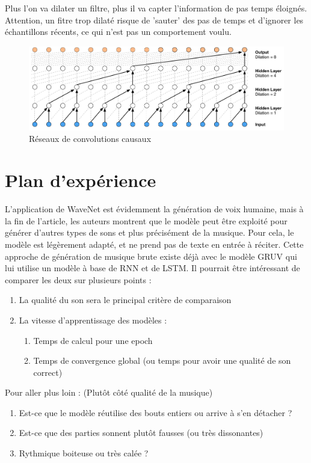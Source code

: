 \documentclass[a4paper]{article}
\begin{document}
Plus l'on va dilater un filtre, plus il va capter l'information de pas temps éloignés. Attention, un fitre trop dilaté risque de 'sauter' des pas de temps et d'ignorer les échantillons récents, ce qui n'est pas un comportement voulu.

\begin{figure}[h]
  \includegraphics[scale=0.2]{modelDilate.png}
  \caption{\label{fig:modelDilate} Réseaux de convolutions causaux}
\end{figure}

\section{Plan d'expérience}

L'application de WaveNet est évidemment la génération de voix humaine, mais à la fin de l'article, les auteurs montrent que le modèle peut être exploité pour générer d'autres types de sons et plus précisément de la musique. Pour cela, le modèle est légèrement adapté, et ne prend pas de texte en entrée à réciter. Cette approche de génération de musique brute existe déjà avec le modèle GRUV \cite{nayebigruv} qui lui utilise un modèle à base de RNN et de LSTM. Il pourrait être intéressant de comparer les deux sur plusieurs points :


\begin{enumerate}
\item La qualité du son sera le principal critère de comparaison
\item La vitesse d'apprentissage des modèles :
  \begin{enumerate}
  \item Temps de calcul pour une epoch
  \item Temps de convergence global (ou temps pour avoir une qualité de son correct)
  \end{enumerate}
\end{enumerate}

Pour aller plus loin : (Plutôt côté qualité de la musique)
\begin{enumerate}
\item Est-ce que le modèle réutilise des bouts entiers ou arrive à s'en détacher ?
\item Est-ce que des parties sonnent plutôt fausses (ou très dissonantes)
\item Rythmique boiteuse ou très calée ?
\end{enumerate}
\end{document}
